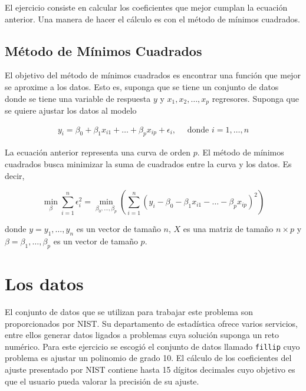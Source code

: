 El ejercicio consiste en calcular los coeficientes que mejor cumplan la ecuación anterior. Una manera de hacer el cálculo es con el método de mínimos cuadrados.  

\subsection{Método de Mínimos Cuadrados}

El objetivo del método de mínimos cuadrados es encontrar una función que mejor se aproxime a los datos. Esto es, suponga que se tiene un conjunto de datos donde se tiene una variable de respuesta $y$ y $x_1, x_2, \dots , x_p$ regresores. Suponga que se quiere ajustar los datos al modelo 

\begin{equation*}
	\begin{aligned}
		y_i = \beta_0 + \beta_1 x_{i1} + \dots + \beta_p x_{ip} + \epsilon_i, \quad \text{ donde } i = 1, \dots, n
	\end{aligned}
\end{equation*}

La ecuación anterior representa una curva de orden $p$. El método de mínimos cuadrados busca minimizar la suma de cuadrados entre la curva y los datos. Es decir,

\begin{equation*}
	\min_{\beta} \sum_{i = 1}^{n} \epsilon_i^{2}	= \min_{\beta_0, \dots, \beta_p} \left(\sum_{i = 1}^{n} (y_i - \beta_0 - \beta_1 x_{i1} - \dots - \beta_p x_{ip})^{2} \right)
 \end{equation*}


\noindent donde $y = y_1, \dots, y_n$ es un vector de tamaño $n$, $X$ es una matriz de tamaño $n \times p$ y $\beta = \beta_1, \dots, \beta_{p}$ es un vector de tamaño $p$. 


\section{Los datos}
El conjunto de datos que se utilizan para trabajar este problema son proporcionados por NIST. Su departamento de estadística ofrece varios servicios, entre ellos generar datos ligados a problemas cuya solución suponga un reto numérico. Para este ejercicio se escogió el conjunto de datos llamado \texttt{fillip} cuyo problema es ajustar un polinomio de grado 10. 
El cálculo de los coeficientes del ajuste presentado por NIST contiene hasta 15 dígitos decimales cuyo objetivo es que el usuario pueda valorar la precisión de su ajuste. 

